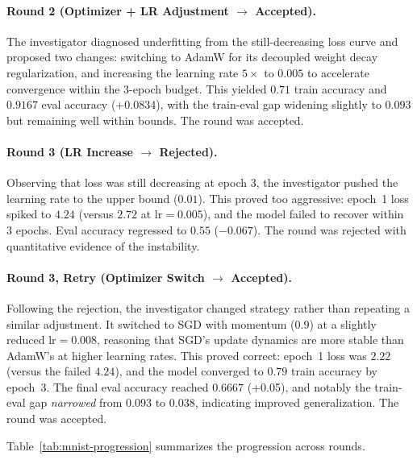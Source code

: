 \paragraph{Round 2 (Optimizer + LR Adjustment $\to$ Accepted).}
The investigator diagnosed underfitting from the still-decreasing loss curve and proposed two changes: switching to AdamW for its decoupled weight decay regularization, and increasing the learning rate $5\times$ to $0.005$ to accelerate convergence within the 3-epoch budget. This yielded $0.71$ train accuracy and $0.9167$ eval accuracy (+0.0834), with the train-eval gap widening slightly to $0.093$ but remaining well within bounds. The round was accepted.

\paragraph{Round 3 (LR Increase $\to$ Rejected).}
Observing that loss was still decreasing at epoch 3, the investigator pushed the learning rate to the upper bound ($0.01$). This proved too aggressive: epoch~1 loss spiked to $4.24$ (versus $2.72$ at $\text{lr} = 0.005$), and the model failed to recover within 3 epochs. Eval accuracy regressed to $0.55$ ($-0.067$). The round was rejected with quantitative evidence of the instability.

\paragraph{Round 3, Retry (Optimizer Switch $\to$ Accepted).}
Following the rejection, the investigator changed strategy rather than repeating a similar adjustment. It switched to SGD with momentum ($0.9$) at a slightly reduced $\text{lr} = 0.008$, reasoning that SGD's update dynamics are more stable than AdamW's at higher learning rates. This proved correct: epoch~1 loss was $2.22$ (versus the failed $4.24$), and the model converged to $0.79$ train accuracy by epoch~3. The final eval accuracy reached $0.6667$ (+0.05), and notably the train-eval gap \emph{narrowed} from $0.093$ to $0.038$, indicating improved generalization. The round was accepted.

Table~\ref{tab:mnist-progression} summarizes the progression across rounds.

